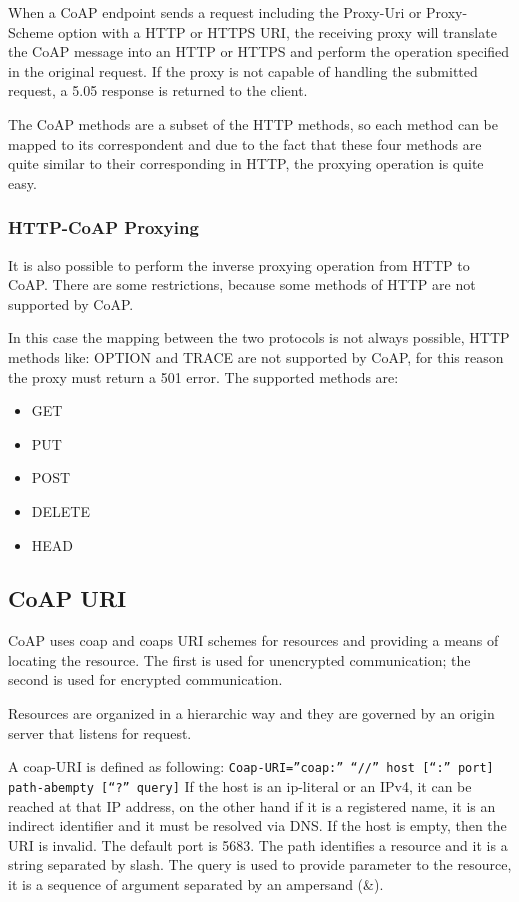 	When a CoAP endpoint sends a request including the Proxy-Uri or Proxy-Scheme option with a HTTP or HTTPS URI, the receiving proxy will translate the CoAP message into an HTTP or HTTPS and perform the operation specified in the original request.\newline
	If the proxy is not capable of handling the submitted request, a 5.05 response is returned to the client.\newline

	The CoAP methods are a subset of the HTTP methods, so each method can be mapped to its correspondent
	and due to the fact that these four methods are quite similar to their corresponding in HTTP, the proxying operation is quite easy.\newline
	
	\subsubsection{HTTP-CoAP Proxying}
	It is also possible to perform the inverse proxying operation from HTTP to CoAP.\newline
	There are some restrictions, because some methods of HTTP are not supported by CoAP.
	
	In this case the mapping between the two protocols is not always possible, HTTP methods like:
	OPTION and TRACE are not supported by CoAP, for this reason the proxy must return a 501 error.\newline
	The supported methods are:
	\begin{itemize}
		\item GET
		\item PUT
		\item POST
		\item DELETE
		\item HEAD
	\end{itemize}
	
	\subsection{CoAP URI}
	CoAP uses coap and coaps URI schemes for resources and providing a means of locating the resource.
	The first is used for unencrypted communication; the second is used for encrypted communication.
	
	Resources are organized in a hierarchic way and they are governed by an origin server that listens for request.
	
	A coap-URI is defined as following:
	\texttt{Coap-URI=”coap:” “//” host [“:” port] path-abempty [“?” query]}
	If the host is an ip-literal or an IPv4, it can be reached at that IP address, on the other hand if it is a registered name, it is an indirect identifier and it must be resolved via DNS.\newline
	If the host is empty, then the URI is invalid.\newline
	The default port is 5683.\newline
	The path identifies a resource and it is a string separated by slash.\newline
	The query is used to provide parameter to the resource, it is a sequence of argument separated by an ampersand (\&).
	
